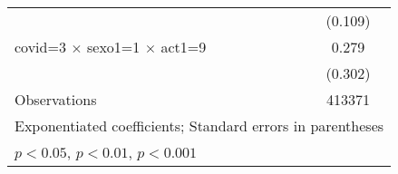 {\begin{tabular}{l*{1}{c}}
                    &     (0.109)         \\
[1em]
covid=3 $\times$ sexo1=1 $\times$ act1=9&       0.279         \\
                    &     (0.302)         \\
\hline
Observations        &      413371         \\
\hline\hline
\multicolumn{2}{l}{\footnotesize Exponentiated coefficients; Standard errors in parentheses}\\
\multicolumn{2}{l}{\footnotesize \sym{*} \(p<0.05\), \sym{**} \(p<0.01\), \sym{***} \(p<0.001\)}\\
\end{tabular}
}
